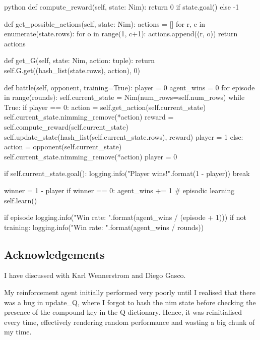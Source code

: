 \begin{mintedbox}{python}
    def compute_reward(self, state: Nim):
        return 0 if state.goal() else -1

    def get_possible_actions(self, state: Nim):
        actions = []
        for r, c in enumerate(state.rows):
            for o in range(1, c+1):
                actions.append((r, o))
        return actions

    def get_G(self, state: Nim, action: tuple):
        return self.G.get((hash_list(state.rows), action), 0)

    def battle(self, opponent, training=True):
        player = 0
        agent_wins = 0
        for episode in range(rounds):
            self.current_state = Nim(num_rows=self.num_rows)
            while True:
                if player == 0:
                    action = self.get_action(self.current_state)
                    self.current_state.nimming_remove(*action)
                    reward = self.compute_reward(self.current_state)
                    self.update_state(hash_list(self.current_state.rows), reward)
                    player = 1
                else:
                    action = opponent(self.current_state)
                    self.current_state.nimming_remove(*action)
                    player = 0

                if self.current_state.goal():
                    logging.info("Player {} wins!".format(1 - player))
                    break

            winner = 1 - player
            if winner == 0:
                agent_wins += 1
            # episodic learning
            self.learn()

            if episode %
                logging.info("Win rate: {}".format(agent_wins / (episode + 1)))
        if not training:
            logging.info("Win rate: {}".format(agent_wins / rounds))
\end{mintedbox}


\subsection{Acknowledgements}

I have discussed with Karl Wennerstrom and Diego Gasco.

My reinforcement agent initially performed very poorly until I realised that there was a bug in update\_Q, where I forgot to hash the nim state before checking the presence of the compound key in the Q dictionary. Hence, it was reinitialised every time, effectively rendering random performance and wasting a big chunk of my time.

